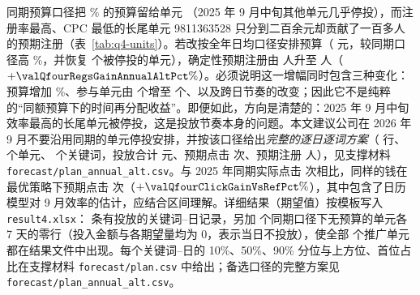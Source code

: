 




同期预算口径把 \valQfourBiggestUnitBudgetSharePct\% 的预算留给单元 \valQfourBiggestUnitId{}（2025 年 9 月中旬其他单元几乎停投），而注册率最高、CPC 最低的长尾单元 9811363528 只分到二百余元却贡献了一百多人的预期注册（表~\ref{tab:q4-units}）。若改按全年日均口径安排预算（\valQfourBudgetAnnualAlt{} 元，较同期口径高 \valQfourBudgetAltOverMainPct\%，并恢复 \valQfourSkippedUnits{} 个被停投的单元），确定性预期注册由 \valQfourRegsExpectedSamePeriod{} 人升至 \valQfourRegsExpectedAnnualAlt{} 人（$+\valQfourRegsGainAnnualAltPct\%$）。必须说明这一增幅同时包含三种变化：预算增加 \valQfourBudgetAltOverMainPct\%、参与单元由 \valQfourUnits{} 个增至 \valQfourAltUnits{} 个、以及跨日节奏的改变；因此它不是纯粹的“同额预算下的时间再分配收益”。即便如此，方向是清楚的：2025 年 9 月中旬效率最高的长尾单元被停投，这是投放节奏本身的问题。本文建议公司在 2026 年 9 月不要沿用同期的单元停投安排，并按该口径给出\emph{完整的逐日逐词方案}（\valQfourAltRows{} 行、\valQfourAltUnits{} 个单元、\valQfourAltKeywords{} 个关键词，投放合计 \valQfourAltSpend{} 元、预期点击 \valQfourAltClicks{} 次、预期注册 \valQfourAltRegs{} 人），见支撑材料 \texttt{forecast/plan\_annual\_alt.csv}。与 2025 年同期实际点击 \valQfourRefClicks{} 次相比，同样的钱在最优策略下预期点击 \valQfourClicksMean{} 次（$+\valQfourClickGainVsRefPct\%$），其中包含了日历模型对 9 月效率的估计，应结合区间理解。详细结果（期望值）按模板写入 \texttt{result4.xlsx}：\valQfourRows{} 条有投放的关键词--日记录，另加 \valQfourSkippedUnits{} 个同期口径下无预算的单元各 7 天的零行（投入金额与各期望量均为 0，表示当日不投放），使全部 \valUnitsCount{} 个推广单元都在结果文件中出现。每个关键词--日的 10\%、50\%、90\% 分位与上方位、首位占比在支撑材料 \texttt{forecast/plan.csv} 中给出；备选口径的完整方案见 \texttt{forecast/plan\_annual\_alt.csv}。
